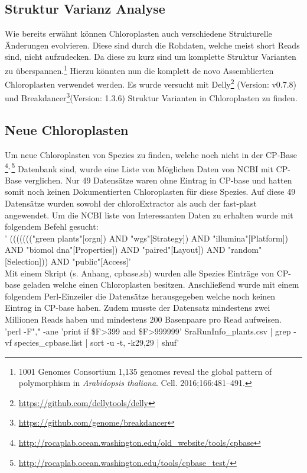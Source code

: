 \documentclass{scrartcl}
\begin{document}
\subsection{Struktur Varianz Analyse}
\label{sec-3-5}
Wie bereits erwähnt können Chloroplasten auch verschiedene Strukturelle Änderungen evolvieren. Diese sind durch die Rohdaten, welche meist short Reads sind, nicht aufzudecken.
Da diese zu kurz sind um komplette Struktur Varianten zu überspannen.\footnote{1001 Genomes Consortium 1,135 genomes reveal the global pattern of polymorphism in \emph{Arabidopsis thaliana}. Cell. 2016;166:481–491.} Hierzu könnten nun die komplett de novo Assemblierten Chloroplasten verwendet werden.
Es wurde versucht mit Delly\footnote{\url{https://github.com/dellytools/delly}} (Version: v0.7.8) und Breakdancer\footnote{\url{https://github.com/genome/breakdancer}

\clearpage}(Version: 1.3.6) Struktur Varianten in Chloroplasten zu finden.  

\subsection{Neue Chloroplasten}
\label{sec-3-6}
Um neue Chloroplasten von Spezies zu finden, welche noch nicht in der CP-Base \footnote{\url{http://rocaplab.ocean.washington.edu/old_website/tools/cpbase}}\textsuperscript{,}\,\footnote{\url{http://rocaplab.ocean.washington.edu/tools/cpbase_test/}} Datenbank sind, wurde eine Liste von Möglichen Daten von NCBI mit CP-Base verglichen. Nur 49 Datensätze waren ohne 
Eintrag in CP-base und hatten somit noch keinen Dokumentierten Chloroplasten für diese Spezies. Auf diese 49 Datensätze wurden sowohl der chloroExtractor als auch der fast-plast angewendet. 
Um die NCBI liste von Interessanten Daten zu erhalten wurde mit folgendem Befehl gesucht:
\\
' ((((((("green plants"[orgn]) AND "wgs"[Strategy]) AND "illumina"[Platform]) AND "biomol dna"[Properties]) AND "paired"[Layout]) AND "random"[Selection])) AND "public"[Access]'
\\
Mit einem Skript (s. Anhang, cpbase.sh) wurden alle Spezies Einträge von CP-base geladen welche einen Chloroplasten besitzen. Anschließend wurde mit einem folgendem Perl-Einzeiler
die Datensätze herausgegeben welche noch keinen Eintrag in CP-base haben. Zudem musste der Datensatz mindestens zwei Millionen Reads haben und mindestens 200 Basenpaare pro Read
aufweisen.
\\
'perl -F"," -ane 'print if \$F\footnotemark[44]{}>399 and \$F\footnotemark[8]{}>999999' SraRunInfo\_plants.csv | grep -vf species\_cpbase.list | sort -u -t, -k29,29 | shuf'
\end{document}
